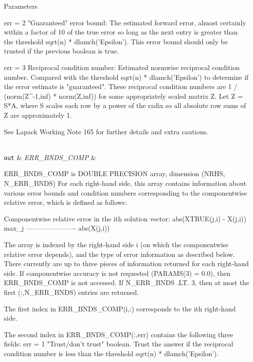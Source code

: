 \begin{DoxyParams}[1]{Parameters}
\begin{DoxyVerb}
     err = 2 "Guaranteed" error bound: The estimated forward error,
              almost certainly within a factor of 10 of the true error
              so long as the next entry is greater than the threshold
              sqrt(n) * dlamch('Epsilon'). This error bound should only
              be trusted if the previous boolean is true.

     err = 3  Reciprocal condition number: Estimated normwise
              reciprocal condition number.  Compared with the threshold
              sqrt(n) * dlamch('Epsilon') to determine if the error
              estimate is "guaranteed". These reciprocal condition
              numbers are 1 / (norm(Z^{-1},inf) * norm(Z,inf)) for some
              appropriately scaled matrix Z.
              Let Z = S*A, where S scales each row by a power of the
              radix so all absolute row sums of Z are approximately 1.

     See Lapack Working Note 165 for further details and extra
     cautions.\end{DoxyVerb}
\\
\hline
\mbox{\tt out}  & {\em E\+R\+R\+\_\+\+B\+N\+D\+S\+\_\+\+C\+O\+M\+P} & \begin{DoxyVerb}          ERR_BNDS_COMP is DOUBLE PRECISION array, dimension (NRHS, N_ERR_BNDS)
     For each right-hand side, this array contains information about
     various error bounds and condition numbers corresponding to the
     componentwise relative error, which is defined as follows:

     Componentwise relative error in the ith solution vector:
                    abs(XTRUE(j,i) - X(j,i))
             max_j ----------------------
                         abs(X(j,i))

     The array is indexed by the right-hand side i (on which the
     componentwise relative error depends), and the type of error
     information as described below. There currently are up to three
     pieces of information returned for each right-hand side. If
     componentwise accuracy is not requested (PARAMS(3) = 0.0), then
     ERR_BNDS_COMP is not accessed.  If N_ERR_BNDS .LT. 3, then at most
     the first (:,N_ERR_BNDS) entries are returned.

     The first index in ERR_BNDS_COMP(i,:) corresponds to the ith
     right-hand side.

     The second index in ERR_BNDS_COMP(:,err) contains the following
     three fields:
     err = 1 "Trust/don't trust" boolean. Trust the answer if the
              reciprocal condition number is less than the threshold
              sqrt(n) * dlamch('Epsilon').


\end{DoxyVerb}
\end{DoxyParams}
